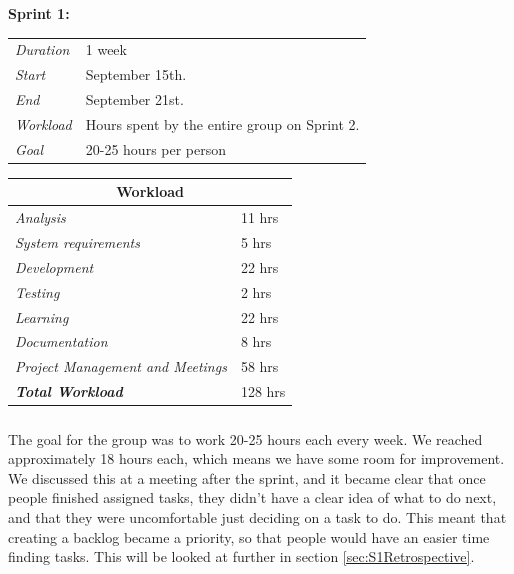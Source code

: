 \begin{minipage}{\linewidth}
\centering
\setlength{\tabcolsep}{22pt}
\textbf{Sprint 1:} 
\smallskip
{}
\begin{tabular}{ |l l| }
	\hline
	\it{Duration} & 1 week \\
	\it{Start} & September 15th. \\
	\it{End} & September 21st. \\
	\it{Workload} & Hours spent by the entire group on Sprint 2. \\
	\it{Goal} & 20-25 hours per person \\
	\hline
\end{tabular}
\end{minipage}
%
\bigskip
%
\begin{minipage}{\linewidth}
\setlength{\tabcolsep}{25pt}
\centering
{}
\begin{tabular}{ |l|l| }
	\hline
	\multicolumn{2}{|c|}{\cellcolor{gray!25} Workload} \\
	\hline
	\it{Analysis} & 11 hrs\\
	\it{System requirements} & 5 hrs\\
	\it{Development} & 22 hrs\\
	\it{Testing} & 2 hrs\\
	\it{Learning} & 22 hrs\\
	\it{Documentation} & 8 hrs\\
	\it{Project Management and Meetings} & 58 hrs\\
	\hline
	\textbf{\textit{Total Workload}} & 128 hrs\\
	\hline
\end{tabular}
\end{minipage}

\bigskip

\subparagraph{} 
The goal for the group was to work 20-25 hours each every week. We reached approximately 18 hours each, which means we have some room for improvement. We discussed this at a meeting after the sprint, and it became clear that once people finished assigned tasks, they didn't have a clear idea of what to do next, and that they were uncomfortable just deciding on a task to do. This meant that creating a backlog became a priority, so that people would have an easier time finding tasks. This will be looked at further in section \ref{sec:S1Retrospective}.

